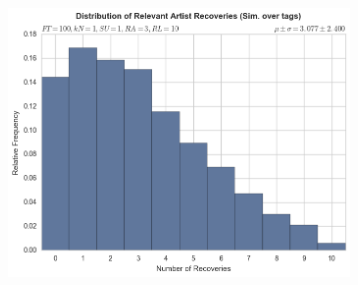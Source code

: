 \documentclass[12pt]{article}
\begin{document}
\begin{figure}[h!]
\begin{subfigure}
  \end{subfigure}
  \begin{subfigure}
      \centering
    \includegraphics[height=2.8in]{tags,FT=100,kN=1,SU=1,RA=3,RL=10.png}
  \end{subfigure}
\end{figure}
\end{document}

